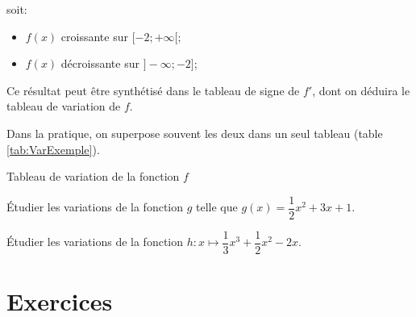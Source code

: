 \documentclass[a4paper,12pt]{scrartcl}
\begin{document}
soit:

\begin{itemize}
 \item $f(x)$ croissante sur $[-2 ; +\infty[$;
 \item $f(x)$ décroissante sur $]-\infty ; -2]$;
\end{itemize}

Ce résultat peut être synthétisé dans le tableau de signe de $f'$, dont on déduira le tableau de variation de $f$. 

Dans la pratique, on superpose souvent les deux dans un seul tableau (table \ref{tab:VarExemple}).

\begin{table}[h]
\begin{center}
\end{center}
\caption{Tableau de variation de la fonction $f$}
\label{tab:VarExemple}
\end{table}

\exemple{}
Étudier les variations de la fonction $g$ telle que $g(x) = \dfrac{1}{2}x^{2} + 3x + 1$.


\exemple{}
Étudier les variations de la fonction $h : x \longmapsto \dfrac{1}{3}x^{3}+\dfrac{1}{2}x^{2}-2 x$.


\section*{Exercices}

\exo{}
\end{document}
